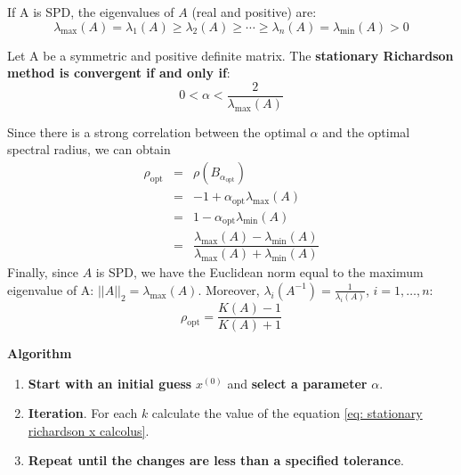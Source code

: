 \noindent
If A is SPD, the eigenvalues of $A$ (real and positive) are:
\begin{equation*}
    \lambda_{\max}\left(A\right) = \lambda_{1}\left(A\right) \ge \lambda_{2}\left(A\right) \ge \cdots \ge \lambda_{n}\left(A\right) = \lambda_{\min}\left(A\right) > 0
\end{equation*}
\begin{theorem}
    Let A be a symmetric and positive definite matrix. The \textbf{stationary Richardson method is convergent if and only if}:
    \begin{equation}
        0 < \alpha < \dfrac{2}{\lambda_{\max}\left(A\right)}
    \end{equation}
\end{theorem}

\noindent
Since there is a strong correlation between the optimal $\alpha$ and the optimal spectral radius, we can obtain
\begin{equation*}
    \begin{array}{rcl}
        \rho_{\text{opt}} &=& \rho\left(B_{\alpha_{\text{opt}}}\right) \\ [.3em]
        &=& -1+\alpha_{\text{opt}}\lambda_{\max}\left(A\right) \\ [.3em]
        &=& 1-\alpha_{\text{opt}}\lambda_{\min}\left(A\right) \\ [.3em]
        &=& \dfrac{
            \lambda_{\max}\left(A\right) - \lambda_{\min}\left(A\right)
        }{
            \lambda_{\max}\left(A\right) + \lambda_{\min}\left(A\right)
        }
    \end{array}
\end{equation*}
Finally, since $A$ is SPD, we have the Euclidean norm equal to the maximum eigenvalue of A: ${\left|\left|A\right|\right|}_{2} = \lambda_{\max}\left(A\right)$. Moreover, $\lambda_{i}\left(A^{-1}\right) = \frac{1}{\lambda_{i}\left(A\right)}$, $i = 1, \dots, n$:
\begin{equation}
    \rho_{\text{opt}} = \dfrac{
        K\left(A\right)-1
    }{
        K\left(A\right)+1
    }
\end{equation}

\begin{flushleft}
    \textcolor{Green3}{ \textbf{Algorithm}}
\end{flushleft}
\begin{enumerate}
    \item \textbf{Start with an initial guess} $x^{\left(0\right)}$ and \textbf{select a parameter} $\alpha$.
    \item \textbf{Iteration}. For each $k$ calculate the value of the equation \ref{eq: stationary richardson x calcolus}.
    \item \textbf{Repeat until the changes are less than a specified tolerance}.
\end{enumerate}

